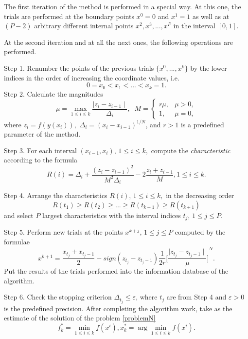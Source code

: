 \documentclass[runningheads]{llncs}
\begin{document}
The first iteration of the method is performed in a special way. At this one, the trials are performed at the boundary points $x^0 = 0$ and $x^1 = 1$ as well as at $(P-2)$ arbitrary different internal points $x^2, x^3, ..., x^P$ in the interval $[0,1]$.

At the second iteration and at all the next ones, the following operations are performed.

Step 1. Renumber the points of the previous trials $\{x^0,...,x^k\}$ by the lower indices in the order of increasing the coordinate values, i.e. 
$$ 0 = x_0 < x_1 < ... < x_k = 1.$$
Step 2. Calculate the magnitudes 
\begin{equation}\label{M}
\mu = \max\limits_{1 \leq i \leq k} \frac{\mid z_i - z_{i-1} \mid}{\Delta_i}, \;\;
M = \left\{ \begin{array}{ll}
                r\mu, & \textrm{$\mu > 0$,}\\
                1, & \textrm{$\mu = 0$},
  \end{array} \right.
\end{equation}
where $z_i = f(y(x_i)),$  $\Delta_i = {(x_i - x_{i-1})}^{1/N}$, and $r > 1$ is a predefined parameter of the method.

Step 3. For each interval $(x_{i-1}, x_i)$, $1 \leq i \leq k,$ compute the \textit{characteristic} according to the formula
\begin{equation}\label{R}
R(i) = \Delta_i + \frac{(z_i - z_{i-1})^2}{M^2 \Delta_i} - 2 \frac{z_i + z_{i-1}}{M}, 1 \leq i \leq k. 
\end{equation} 

Step 4. Arrange the characteristics $R(i)$, $1 \leq i \leq k,$ in the decreasing order
\begin{equation} \label{OrderedR}
 R(t_1) \geq R(t_2) \geq ... \geq R(t_{k-1}) \geq R(t_{k+1}) 
\end{equation}
and select $P$ largest characteristics with the interval indices $t_j$, $1 \leq j \leq P$.

Step 5. Perform new trials at the points $x^{k+j}$, $1 \leq j \leq P$ computed by the formulae
$$ x^{k+1} = \frac{x_{t_j} + x_{t_j - 1}}{2} - sign(z_{t_j} - z_{t_j - 1}) \frac{1}{2r} {\Bigg[\frac{\mid z_{t_j} - z_{t_j - 1} \mid}{\mu}\Bigg]}^{N}.$$
Put the results of the trials performed into the information database of the algorithm.

Step 6. Check the stopping criterion $\Delta_{t_j} \leq \varepsilon$, where $t_j$ are from Step 4 and $\varepsilon > 0$ is the predefined precision. 
After completing the algorithm work, take as the estimate of the solution of the problem \ref{problemN} 
$$ f_k^* = \min\limits_{1 \leq i \leq k} f(x^i), x_k^* = \arg \min\limits_{1 \leq i \leq k} f(x^i).$$
\end{document}
